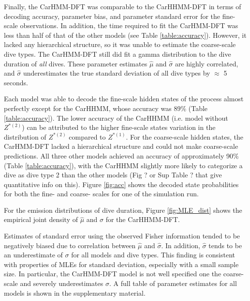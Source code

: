 Finally, the CarHMM-DFT was comparable to the CarHHMM-DFT in terms of decoding accuracy, parameter bias, and parameter standard error for the fine-scale observations. In addition, the time required to fit the CarHMM-DFT was less than half of that of the other models (see Table \ref{table:accuracy}). However, it lacked any hierarchical structure, so it was unable to estimate the coarse-scale dive types. The CarHMM-DFT still did fit a gamma distribution to the dive duration of \textit{all} dives. These parameter estimates $\hat \mu$ and $\hat \sigma$ are highly correlated, and $\hat \sigma$ underestimates the true standard deviation of all dive types by $\approx$ 5 seconds.






\iffalse
Each model was able to decode the fine-scale hidden states of the process almost perfectly except for the CarHHMM, whose accuracy was 89\% (Table \ref{table:accuracy}). The lower accuracy of the CarHHMM (i.e. model without $Z^{*(2)}$)  can be attributed to the higher fine-scale states variation in the distribution of $Z^{*(2)}$ compared to $Z^{*(1)}$. For the coarse-scale hidden states, the CarHMM-DFT lacked a hierarchical structure and could not make coarse-scale predictions. All three other models achieved an accuracy of approximately 90\% (Table \ref{table:accuracy}), with the CarHHMM slightly more likely to categorize a dive as dive type 2 than the other models (Fig ? or Sup Table ? that give quantitative info on this). Figure \ref{fig:acc} shows the decoded state probabilities for both the fine- and coarse- scales for one of the simulation run.

For the emission distributions of dive duration, Figure \ref{fig:MLE_dist} shows the empirical joint density of $\hat \mu$ and $\hat \sigma$ for the CarHHMM-DFT.

Estimates of standard error using the observed Fisher information tended to be negatively biased due to correlation between $\hat \mu$ and $\hat \sigma$. In addition, $\hat \sigma$ tends to be an underestimate of $\sigma$ for all models and dive types. This finding is consistent with properties of MLEs for standard deviation, especially with a small sample size. In particular, the CarHMM-DFT model is not well specified one the coarse-scale and severely underestimates $\sigma$. %
A full table of parameter estimates for all models is shown in the supplementary material.


